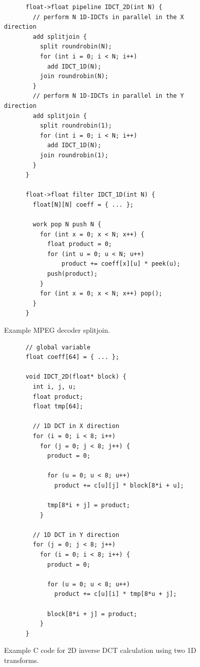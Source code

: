 \begin{figure}[t]
  \begin{scriptsize}
    \begin{verbatim}
      float->float pipeline IDCT_2D(int N) {
        // perform N 1D-IDCTs in parallel in the X direction
        add splitjoin {
          split roundrobin(N);
          for (int i = 0; i < N; i++)
            add IDCT_1D(N);
          join roundrobin(N);
        }
        // perform N 1D-IDCTs in parallel in the Y direction
        add splitjoin {
          split roundrobin(1);
          for (int i = 0; i < N; i++)
            add IDCT_1D(N);
          join roundrobin(1);
        }
      }

      float->float filter IDCT_1D(int N) {
        float[N][N] coeff = { ... };
        
        work pop N push N {
          for (int x = 0; x < N; x++) {
            float product = 0;
            for (int u = 0; u < N; u++)
                product += coeff[x][u] * peek(u);
            push(product);
          }
          for (int x = 0; x < N; x++) pop();
        }
      }
    \end{verbatim}
  \end{scriptsize}
  \caption{Example MPEG decoder splitjoin.}
  \label{fig:decoder-sj}
\end{figure}

\begin{figure}[t]
  \begin{scriptsize}
    \begin{verbatim}
      // global variable
      float coeff[64] = { ... };
      
      void IDCT_2D(float* block) {
        int i, j, u;
        float product;
        float tmp[64];
        
        // 1D DCT in X direction
        for (i = 0; i < 8; i++)
          for (j = 0; j < 8; j++) {
            product = 0;

            for (u = 0; u < 8; u++)
              product += c[u][j] * block[8*i + u];

            tmp[8*i + j] = product;
          }

        // 1D DCT in Y direction
        for (j = 0; j < 8; j++)
          for (i = 0; i < 8; i++) {
            product = 0;

            for (u = 0; u < 8; u++)
              product += c[u][i] * tmp[8*u + j];

            block[8*i + j] = product;
          }
      }
    \end{verbatim}
  \end{scriptsize}
  \vspace{-12pt}
  \caption{Example C code for 2D inverse DCT calculation using two 1D transforms.}
  \label{fig:idct_creference}
\end{figure}

